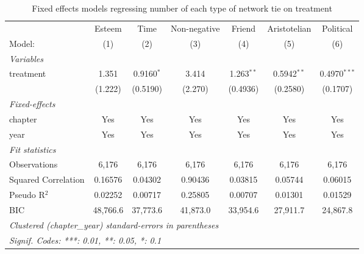 
\begin{table}[htbp]
   \caption{\label{tab:net_count} Fixed effects models regressing number of each type of network tie on treatment}
   \centering
   \begin{tabular}{lcccccc}
      \tabularnewline \midrule \midrule
                          & Esteem   & Time         & Non-negative & Friend       & Aristotelian  & Political \\   
      Model:              & (1)      & (2)          & (3)          & (4)          & (5)           & (6)\\  
      \midrule
      \emph{Variables}\\
      treatment           & 1.351    & 0.9160$^{*}$ & 3.414        & 1.263$^{**}$ & 0.5942$^{**}$ & 0.4970$^{***}$\\   
                          & (1.222)  & (0.5190)     & (2.270)      & (0.4936)     & (0.2580)      & (0.1707)\\   
      \midrule
      \emph{Fixed-effects}\\
      chapter             & Yes      & Yes          & Yes          & Yes          & Yes           & Yes\\  
      year                & Yes      & Yes          & Yes          & Yes          & Yes           & Yes\\  
      \midrule
      \emph{Fit statistics}\\
      Observations        & 6,176    & 6,176        & 6,176        & 6,176        & 6,176         & 6,176\\  
      Squared Correlation & 0.16576  & 0.04302      & 0.90436      & 0.03815      & 0.05744       & 0.06015\\  
      Pseudo R$^2$        & 0.02252  & 0.00717      & 0.25805      & 0.00707      & 0.01301       & 0.01529\\  
      BIC                 & 48,766.6 & 37,773.6     & 41,873.0     & 33,954.6     & 27,911.7      & 24,867.8\\  
      \midrule \midrule
      \multicolumn{7}{l}{\emph{Clustered (chapter\_year) standard-errors in parentheses}}\\
      \multicolumn{7}{l}{\emph{Signif. Codes: ***: 0.01, **: 0.05, *: 0.1}}\\
   \end{tabular}
\end{table}


